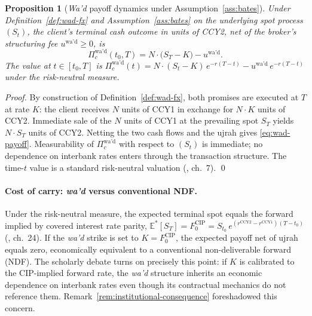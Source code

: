 \documentclass[preprint,12pt,authoryear]{elsarticle}
\newcommand{\EE}{\mathbb{E}}
\newtheorem{proposition}{Proposition}[section]
\theoremstyle{definition}
\begin{document}
\begin{proposition}[\emph{Wa'd} payoff dynamics under
    Assumption~\ref{ass:bates}]
\label{prop:wad-payoff}
Under Definition~\ref{def:wad-fx} and Assumption~\ref{ass:bates} on
the underlying spot process $(S_t)$, the client's terminal cash
outcome in units of CCY2, net of the broker's structuring fee
$u^{\text{wa'd}} \geq 0$, is
\begin{equation}
    \Pi^{\text{wa'd}}_{c}(t_0, T)
    = N \cdot \bigl( S_T - K \bigr) - u^{\text{wa'd}}.
    \label{eq:wad-payoff}
\end{equation}
The value at $t \in [t_0, T]$ is
$\Pi^{\text{wa'd}}_{c}(t) = N \cdot (S_t - K)\,e^{-r(T-t)}
- u^{\text{wa'd}}\,e^{-r(T-t)}$
under the risk-neutral measure.
\end{proposition}

\begin{proof}
By construction of Definition~\ref{def:wad-fx}, both promises are
executed at $T$ at rate $K$: the client receives $N$ units of CCY1
in exchange for $N \cdot K$ units of CCY2. Immediate sale of the $N$
units of CCY1 at the prevailing spot $S_T$ yields $N \cdot S_T$
units of CCY2. Netting the two cash flows and the ujrah gives
\eqref{eq:wad-payoff}. Measurability of $\Pi^{\text{wa'd}}_c$ with
respect to $(S_t)$ is immediate; no dependence on interbank rates
enters through the transaction structure. The time-$t$ value is a
standard risk-neutral valuation
(\citealp{Bjork2009}, ch.~7). \qed
\end{proof}

\paragraph{Cost of carry: \emph{wa'd} versus conventional NDF.}
Under the risk-neutral measure, the expected terminal spot equals
the forward implied by covered interest rate parity,
$\EE^{*}[S_T] = F^{\text{CIP}}_0 = S_{t_0}\,
e^{(r^{\text{CCY2}} - r^{\text{CCY1}})(T - t_0)}$
(\citealp{Bjork2009}, ch.~24). If the \emph{wa'd} strike is set to
$K = F^{\text{CIP}}_0$, the expected payoff net of ujrah equals zero,
economically equivalent to a conventional non-deliverable
forward (NDF). The scholarly debate turns on precisely this point:
if $K$ is calibrated to the CIP-implied forward rate, the
\emph{wa'd} structure inherits an economic dependence on interbank
rates even though its contractual mechanics do not reference them.
Remark~\ref{rem:institutional-consequence} foreshadowed this
concern.
\end{document}
